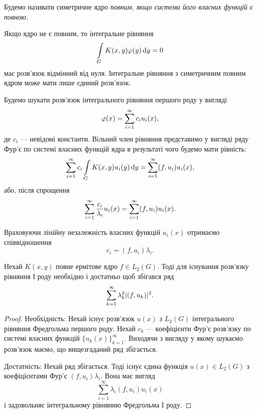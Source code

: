 \begin{definition}
	Будемо називати симетричне ядро \it{повним}, якщо система його власних функцій є повною.
\end{definition}

Якщо ядро не є повним, то інтегральне рівняння
\begin{equation}
    \displaystyle\int\limits_G K(x,y)\varphi(y)\mathop{}\!\mathrm{d} y=0
\end{equation}
має розв'язок відмінний від нуля. Інтегральне рівняння з симетричним повним ядром може мати лише єдиний розв'язок. \medskip

Будемо шукати розв'язок інтегрального рівняння першого роду у вигляді
\begin{equation}
	\varphi(x) = \displaystyle\sum\limits_{i=1}^\infty c_i u_i(x),
\end{equation}
де $c_i$ --- невідомі константи. Вільний член рівняння представимо у вигляді ряду Фур'є по системі власних функцій ядра в результаті чого будемо мати рівність:
\begin{equation}
	\displaystyle\sum\limits_{i=1}^\infty c_i \displaystyle\int\limits_G K(x,y) u_i(y) \mathop{}\!\mathrm{d} y = \displaystyle\sum\limits_{i=1}^\infty (f,u_i)u_i(x),
\end{equation}
або, після спрощення
\begin{equation}
	\displaystyle\sum\limits_{i=1}^\infty \dfrac{c_i}{\lambda_i} u_i(x) = \displaystyle\sum\limits_{i=1}^\infty (f,u_i)u_i(x).
\end{equation}

Враховуючи лінійну незалежність власних функцій $u_i(x)$ отримаємо співвідношення 
\begin{equation}
	c_i = (f, u_i) \lambda_i.
\end{equation}

\begin{theorem} 
	Нехай $K(x, y)$ повне ермітове ядро $f \in L_2(G)$. Тоді для існування розв'язку рівняння І роду необхідно і достатньо щоб збігався ряд
	\begin{equation}
		\displaystyle\sum\limits_{k=1}^\infty \lambda_k^2 |(f, u_k)|^2.
	\end{equation}
\end{theorem}

\begin{proof}
	Необхідність: Нехай існує розв'язок $u(x)$ з $L_2(G)$ інтегрального рівняння Фредгольма першого роду. Нехай $c_k$ --- коефіцієнти Фур'є розв'язку по системі власних функцій $\{u_k(x)\}_{k=1}^\infty$. Виходячи з вигляду у якому шукаємо розв'язок маємо, що вищезгаданий ряд збігається. \medskip

	Достатність: Нехай ряд збігається. Тоді існує єдина функція $u(x) \in L_2(G)$ з коефіцієнтами Фур'є $(f,u_i)\lambda_i$. Вона має вигляд
	\begin{equation}
		\sum_{i=1}^\infty \lambda_i(f,u_i)u_i(x)
	\end{equation}
	і задовольняє інтегральному рівнянню Фредгольма І роду.
\end{proof}

